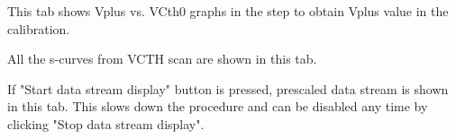 \documentclass[11pt,a4paper]{article}
\begin{document}
\begin{description}[style=nextline]
	\item[Vplus vs. VCth0 Graphs]
	This tab shows Vplus vs. VCth0 graphs in the step to obtain Vplus value in the calibration. 

	\item[Scurve Histograms]
	All the s-curves from VCTH scan are shown in this tab.

	\item[Data]
	If "Start data stream display" button is pressed, prescaled data stream is shown in this tab.  This slows down the procedure and can be disabled
	any time by clicking "Stop data stream display".

	\end{description}

	
	
	
\end{document}
